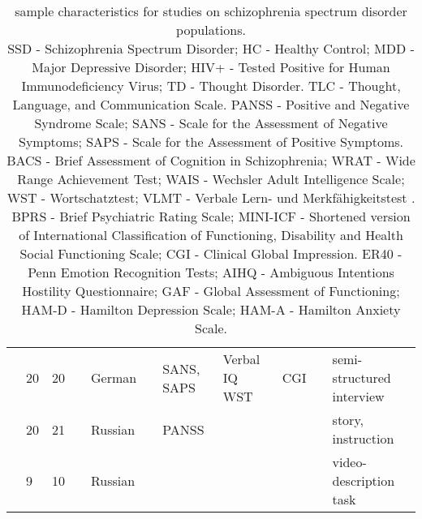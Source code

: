 \begin{sidewaystable}[ht]
{\begin{tabular}{lllllllllll}
\cite{just2020modeling} & 20 & 20 &  & German &  & SANS, SAPS & Verbal IQ WST & CGI &  & semi-structured interview \\
\cite{ryazanskaya2020thesis} & 20 & 21 &  & Russian &  & PANSS &  &  &  & story, instruction \\
\cite{ryazanskaya2020automated} & 9 & 10 &  & Russian &  &  &  &  &  & video-description task \\
\hline
\end{tabular}
}
\caption[Sample Characteristics for Studies on Schizophrenia Spectrum Disorder Populations]{\label{tab:dataset:SDD} sample characteristics for studies on schizophrenia spectrum disorder populations. \\ SSD - Schizophrenia Spectrum Disorder; HC - Healthy Control; MDD - Major Depressive Disorder; HIV+ - Tested Positive for Human Immunodeficiency Virus; TD - Thought Disorder. TLC -  Thought, Language, and Communication Scale.  PANSS - Positive and Negative Syndrome Scale; SANS - Scale for the Assessment of Negative Symptoms; SAPS - Scale for the Assessment of Positive Symptoms. BACS - Brief Assessment of Cognition in Schizophrenia;  WRAT - Wide Range Achievement Test; WAIS - Wechsler Adult Intelligence Scale; WST - Wortschatztest; VLMT - Verbale Lern- und Merkfähigkeitstest . BPRS - Brief Psychiatric Rating Scale; MINI-ICF - Shortened version of International Classification of Functioning, Disability and Health Social Functioning Scale; CGI - Clinical Global Impression. ER40 - Penn Emotion Recognition Tests; AIHQ - Ambiguous Intentions Hostility Questionnaire; GAF - Global Assessment of Functioning; HAM-D - Hamilton Depression Scale; HAM-A - Hamilton Anxiety Scale.} 
\end{sidewaystable}



